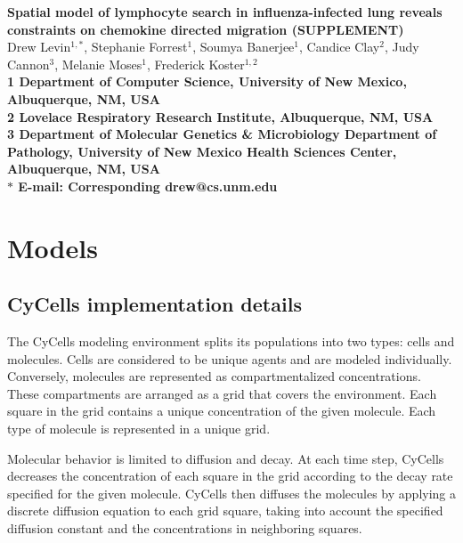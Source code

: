 \documentclass[10pt]{article}
\date{}
\begin{document}
\begin{flushleft}
{\Large
\textbf{Spatial model of lymphocyte search in influenza-infected lung reveals constraints on chemokine directed migration (SUPPLEMENT)}
}
\\
Drew Levin$^{1,\ast}$, 
Stephanie Forrest$^{1}$, 
Soumya Banerjee$^{1}$,
Candice Clay$^{2}$, 
Judy Cannon$^{3}$,
Melanie Moses$^{1}$, 
Frederick Koster$^{1,2}$
\\
\bf{1} Department of Computer Science, University of New Mexico, Albuquerque, NM, USA
\\
\bf{2} Lovelace Respiratory Research Institute, Albuquerque, NM, USA
\\
\bf{3} Department of Molecular Genetics \& Microbiology Department of Pathology, University of New Mexico Health Sciences Center, Albuquerque, NM, USA
\\
$\ast$ E-mail: Corresponding drew@cs.unm.edu
\end{flushleft}


\section{Models}

\subsection{CyCells implementation details}

The CyCells modeling environment splits its populations into two types: cells and molecules.  Cells are considered to be unique agents and are modeled individually.  Conversely, molecules are represented as compartmentalized concentrations.  These compartments are arranged as a grid that covers the environment.  Each square in the grid contains a unique concentration of the given molecule.  Each type of  molecule is represented in a unique grid.

Molecular behavior is limited to diffusion and decay.  At each time step, CyCells decreases the concentration of each square in the grid according to the decay rate specified for the given molecule.  CyCells then diffuses the molecules by applying a discrete diffusion equation to each grid square, taking into account the specified diffusion constant and the concentrations in neighboring squares.
\end{document}

